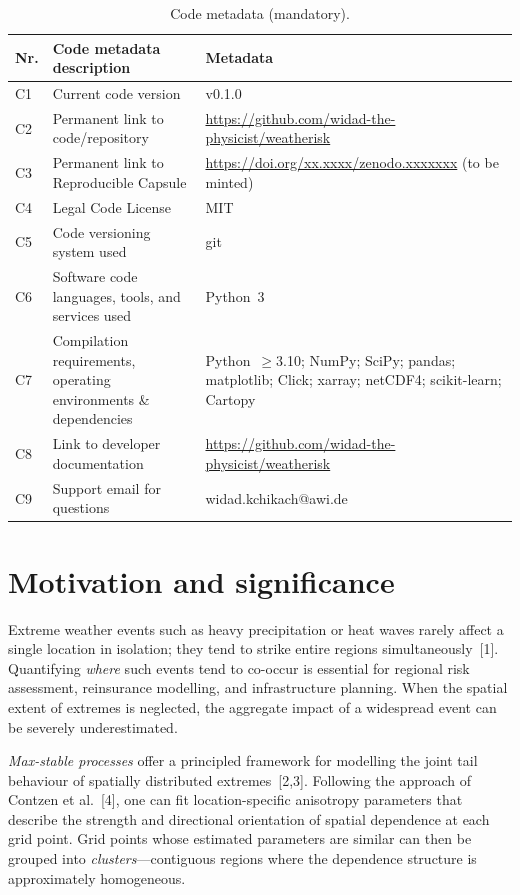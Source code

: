 \documentclass[preprint,12pt,a4paper]{elsarticle}
\begin{document}
\begin{table}[!h]
\begin{tabular}{|l|p{6.5cm}|p{6.5cm}|}
\hline
\textbf{Nr.} & \textbf{Code metadata description} & \textbf{Metadata} \\
\hline
C1 & Current code version & v0.1.0 \\
\hline
C2 & Permanent link to code/repository &
  \url{https://github.com/widad-the-physicist/weatherisk} \\
\hline
C3 & Permanent link to Reproducible Capsule &
  \url{https://doi.org/xx.xxxx/zenodo.xxxxxxx} (to be minted) \\
\hline
C4 & Legal Code License & MIT \\
\hline
C5 & Code versioning system used & git \\
\hline
C6 & Software code languages, tools, and services used & Python~3 \\
\hline
C7 & Compilation requirements, operating environments
  \& dependencies &
  Python~$\geq$3.10; NumPy; SciPy; pandas; matplotlib;
  Click; xarray; netCDF4; scikit-learn; Cartopy \\
\hline
C8 & Link to developer documentation &
  \url{https://github.com/widad-the-physicist/weatherisk} \\
\hline
C9 & Support email for questions & widad.kchikach@awi.de \\
\hline
\end{tabular}
\caption{Code metadata (mandatory).}
\label{tab:metadata}
\end{table}


\section{Motivation and significance}
\label{sec:motivation}

Extreme weather events such as heavy precipitation or heat waves
rarely affect a single location in isolation; they tend to strike
entire regions simultaneously~[1].  Quantifying \emph{where} such
events tend to co-occur is essential for regional risk assessment,
reinsurance modelling, and infrastructure planning.  When the spatial
extent of extremes is neglected, the aggregate impact of a
widespread event can be severely underestimated.

\emph{Max-stable processes} offer a principled framework for
modelling the joint tail behaviour of spatially distributed
extremes~[2,3].  Following the approach of Contzen et al.~[4],
one can fit location-specific anisotropy parameters that describe
the strength and directional orientation of spatial dependence at
each grid point.  Grid points whose estimated parameters are
similar can then be grouped into \emph{clusters}---contiguous
regions where the dependence structure is approximately
homogeneous.
\end{document}
